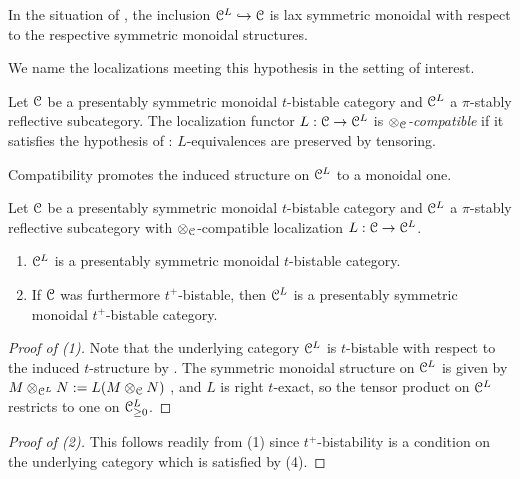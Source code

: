 \begin{remark}\label{rmk: inclusion is lax}
    In the situation of , the inclusion $\EuScript{C}^{L}\hookrightarrow\EuScript{C}$ is lax symmetric monoidal with respect to the respective symmetric monoidal structures. 
\end{remark}
We name the localizations meeting this hypothesis in the setting of interest.
\begin{definition}\label{def: compatible localization}
    Let $\EuScript{C}$ be a presentably symmetric monoidal $t$-bistable category and $\EuScript{C}^{L}$ a $\pi$-stably reflective subcategory. The localization functor $L:\EuScript{C}\to\EuScript{C}^{L}$ is \emph{$\otimes_{\EuScript{C}}$-compatible} if it satisfies the hypothesis of : $L$-equivalences are preserved by tensoring. 
\end{definition}
Compatibility promotes the induced structure on $\EuScript{C}^{L}$ to a monoidal one.
\begin{proposition}\label{prop: compatible localization implies pres sym mon t-bistable}
    Let $\EuScript{C}$ be a presentably symmetric monoidal $t$-bistable category and $\EuScript{C}^{L}$ a $\pi$-stably reflective subcategory with $\otimes_{\EuScript{C}}$-compatible localization $L:\EuScript{C}\to\EuScript{C}^{L}$. 
    \begin{enumerate}
        \item $\EuScript{C}^{L}$ is a presentably symmetric monoidal $t$-bistable category. 
        \item If $\EuScript{C}$ was furthermore $t^{+}$-bistable, then $\EuScript{C}^{L}$ is a presentably symmetric monoidal $t^{+}$-bistable category. 
    \end{enumerate}
\end{proposition}
\begin{proof}[Proof of (1)]
    Note that the underlying category $\EuScript{C}^{L}$ is $t$-bistable with respect to the induced $t$-structure by . The symmetric monoidal structure on $\EuScript{C}^{L}$ is given by $M\otimes_{\EuScript{C}^{L}}N:=L(M\otimes_{\EuScript{C}}N)$ \cite[Prop. 2.2.1.9]{HA}, and $L$ is right $t$-exact, so the tensor product on $\EuScript{C}^{L}$ restricts to one on $\EuScript{C}^{L}_{\geq0}$. 
\end{proof}
\begin{proof}[Proof of (2)]
    This follows readily from (1) since $t^{+}$-bistability is a condition on the underlying category which is satisfied by  (4). 
\end{proof}
